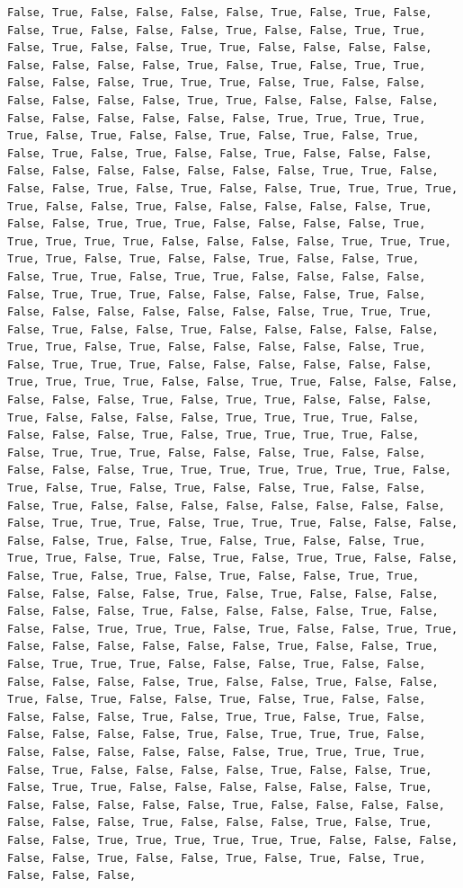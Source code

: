 \documentclass[
  letterpaper,
  DIV=11,
  numbers=noendperiod]{scrartcl}
\begin{document}
\begin{verbatim}
False, True, False, False, False, False, True, False, True, False, False, True, False, False, False, True, False, False, True, True, False, True, False, False, True, True, False, False, False, False, False, False, False, False, True, False, True, False, True, True, False, False, False, True, True, True, False, True, False, False, False, False, False, False, True, True, False, False, False, False, False, False, False, False, False, False, True, True, True, True, True, False, True, False, False, True, False, True, False, True, False, True, False, True, False, False, True, False, False, False, False, False, False, False, False, False, False, True, True, False, False, False, True, False, True, False, False, True, True, True, True, True, False, False, True, False, False, False, False, False, True, False, False, True, True, True, False, False, False, False, True, True, True, True, True, False, False, False, False, True, True, True, True, True, False, True, False, False, True, False, False, True, False, True, True, False, True, True, False, False, False, False, False, True, True, True, False, False, False, False, True, False, False, False, False, False, False, False, False, True, True, True, False, True, False, False, True, False, False, False, False, False, True, True, False, True, False, False, False, False, False, True, False, True, True, True, False, False, False, False, False, False, True, True, True, True, False, False, True, True, False, False, False, False, False, False, True, False, True, True, False, False, False, True, False, False, False, False, True, True, True, True, False, False, False, False, True, False, True, True, True, True, False, False, True, True, True, False, False, False, True, False, False, False, False, False, True, True, True, True, True, True, True, False, True, False, True, False, True, False, False, True, False, False, False, True, False, False, False, False, False, False, False, False, False, True, True, True, False, True, True, True, False, False, False, False, False, True, False, True, False, True, False, False, True, True, True, False, True, False, True, False, True, True, False, False, False, True, False, True, False, True, False, False, True, True, False, False, False, False, True, False, True, False, False, False, False, False, False, True, False, False, False, False, True, False, False, False, True, True, True, False, True, False, False, True, True, False, False, False, False, False, False, True, False, False, True, False, True, True, True, False, False, False, True, False, False, False, False, False, False, True, False, False, True, False, False, True, False, True, False, False, True, False, True, False, False, False, False, False, True, False, True, True, False, True, False, False, False, False, False, True, False, True, True, True, False, False, False, False, False, False, False, True, True, True, True, False, True, False, False, False, False, True, False, False, True, False, True, True, False, False, False, False, False, False, True, False, False, False, False, False, True, False, False, False, False, False, False, False, True, False, False, False, True, False, True, False, False, True, True, True, True, True, True, False, False, False, False, False, True, False, False, True, False, True, False, True, False, False, False, 
\end{verbatim}
\end{document}
